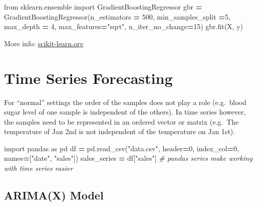\documentclass[
]{book}
\newenvironment{Shaded}{\begin{snugshade}}{\end{snugshade}}
\newcommand{\CommentTok}[1]{\textcolor[rgb]{0.56,0.35,0.01}{\textit{#1}}}
\newcommand{\DecValTok}[1]{\textcolor[rgb]{0.00,0.00,0.81}{#1}}
\newcommand{\ImportTok}[1]{#1}
\newcommand{\NormalTok}[1]{#1}
\newcommand{\OperatorTok}[1]{\textcolor[rgb]{0.81,0.36,0.00}{\textbf{#1}}}
\newcommand{\StringTok}[1]{\textcolor[rgb]{0.31,0.60,0.02}{#1}}
\begin{document}
\begin{Shaded}
\begin{Highlighting}[]
\ImportTok{from}\NormalTok{ sklearn.ensemble }\ImportTok{import}\NormalTok{ GradientBoostingRegressor}
\NormalTok{gbr }\OperatorTok{=}\NormalTok{ GradientBoostingRegressor(n\_estimators }\OperatorTok{=} \DecValTok{500}\NormalTok{, min\_samples\_split }\OperatorTok{=}\DecValTok{5}\NormalTok{, max\_depth }\OperatorTok{=} \DecValTok{4}\NormalTok{, max\_features}\OperatorTok{=}\StringTok{"sqrt"}\NormalTok{, n\_iter\_no\_change}\OperatorTok{=}\DecValTok{15}\NormalTok{)}
\NormalTok{gbr.fit(X, y)}
\end{Highlighting}
\end{Shaded}

More info:
\href{https://scikit-learn.org/stable/modules/generated/sklearn.ensemble.GradientBoostingRegressor.html}{scikit-learn.org}\\

\hypertarget{time-series-forecasting}{%
\section{Time Series Forecasting}\label{time-series-forecasting}}

For ``normal'' settings the order of the samples does not play a role (e.g.~blood sugar level of one sample is independent of the others). In time series however, the samples need to be represented in an ordered vector or matrix (e.g.~The temperature of Jan 2nd is not independent of the temperature on Jan 1st).

\begin{Shaded}
\begin{Highlighting}[]
\ImportTok{import}\NormalTok{ pandas }\ImportTok{as}\NormalTok{ pd}
\NormalTok{df }\OperatorTok{=}\NormalTok{ pd.read\_csv(}\StringTok{"data.csv"}\NormalTok{, header}\OperatorTok{=}\DecValTok{0}\NormalTok{, index\_col}\OperatorTok{=}\DecValTok{0}\NormalTok{, names}\OperatorTok{=}\NormalTok{[}\StringTok{"date"}\NormalTok{, }\StringTok{"sales"}\NormalTok{])}
\NormalTok{sales\_series }\OperatorTok{=}\NormalTok{ df[}\StringTok{"sales"}\NormalTok{] }\CommentTok{\# pandas series make working with time series easier }
\end{Highlighting}
\end{Shaded}

\hypertarget{arimax-model}{%
\subsection{ARIMA(X) Model}\label{arimax-model}}
\end{document}
